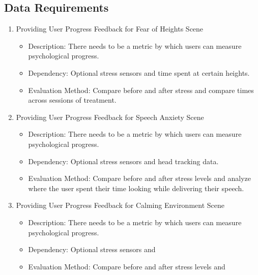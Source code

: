 \documentclass[a4paper,10pt]{article}
\begin{document}
	\subsection{Data Requirements}
	\begin{enumerate}
	\item Providing User Progress Feedback for Fear of Heights Scene
	\begin{itemize}
	  \item Description: There needs to be a metric by which users can measure psychological progress.
	  \item Dependency: Optional stress sensors and time spent at certain heights.
	  \item Evaluation Method: Compare before and after stress and compare times across sessions of treatment.
	\end{itemize}
	\item Providing User Progress Feedback for Speech Anxiety Scene
	\begin{itemize}
		\item Description: There needs to be a metric by which users can measure psychological progress.
		\item Dependency: Optional stress sensors and head tracking data.
		\item Evaluation Method: Compare before and after stress levels and analyze where the user spent their time looking while delivering their speech.
	\end{itemize}
	\item Providing User Progress Feedback for Calming Environment Scene
	\begin{itemize}
		\item Description: There needs to be a metric by which users can measure psychological progress.
		\item Dependency: Optional stress sensors and %
		\item Evaluation Method: Compare before and after stress levels and 
	\end{itemize}	
	\end{enumerate}
	
\end{document}
